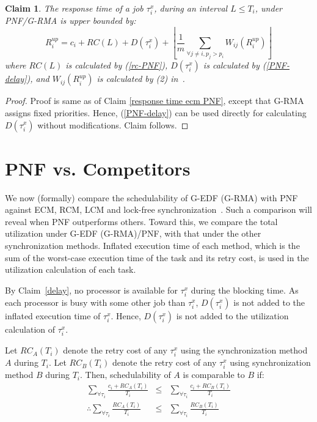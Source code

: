 \documentclass[a4paper,english]{article}
\newtheorem{clm}{Claim}
\newtheorem{proof}{Proof}
\begin{document}
\begin{clm}\label{response rcm PNF}
The response time of a job $\tau_{i}^{x}$, during an interval $L\le T_{i}$, under PNF/G-RMA is upper bounded by: 
\begin{equation}
R_{i}^{up}=c_{i}+RC(L)+D(\tau_{i}^{x})+\left\lfloor \frac{1}{m}\sum_{\forall j\ne i,p_j>p_i}W_{ij}(R_{i}^{up})\right\rfloor 
\end{equation}
where $RC(L)$ is calculated by (\ref{rc-PNF}), $D(\tau_{i}^{x})$
is calculated by (\ref{PNF-delay}), and $W_{ij}(R_{i}^{up})$
is calculated by (2) in~\cite{stmconcurrencycontrol:emsoft11}.
\end{clm}
\begin{proof}\normalfont
Proof is same as of Claim \ref{response time ecm PNF}, 
except that G-RMA assigns fixed priorities. Hence, (\ref{PNF-delay}) can be used directly for calculating $D(\tau_{i}^{x})$ without modifications. Claim follows.
\end{proof}


\section{PNF vs. Competitors}
\label{sec:pnf-sched-comparison}

We now (formally) compare the schedulability of G-EDF (G-RMA) with PNF against ECM, RCM, LCM and lock-free synchronization~\cite{stmconcurrencycontrol:emsoft11,lcmdac2012, key-5}. 
Such a comparison will reveal when PNF outperforms  others. 
Toward this, we compare the total utilization under G-EDF (G-RMA)/PNF,  with that under the other synchronization methods.
Inflated execution time of each method, which is the sum of the worst-case execution time of the task and its retry cost, is used in the utilization calculation of each task.

By Claim~\ref{delay}, no processor is available for $\tau_i^x$ during the blocking time. As each processor is busy with some other job than $\tau_i^x$, $D(\tau_i^x)$ is not added to the inflated execution time of $\tau_i^x$. Hence, $D(\tau_i^x)$ is not added to the utilization calculation of $\tau_i^x$.

Let $RC_{A}(T_{i})$ denote the retry cost of any $\tau_i^x$ using the synchronization method $A$ during $T_i$. Let $RC_{B}(T_{i})$ denote the  retry cost of any $\tau_i^x$ using synchronization method $B$ during $T_i$. Then, schedulability of $A$ is comparable to $B$ if:
\begin{eqnarray}
\sum_{\forall\tau_{i}}\frac{c_{i}+RC_{A}(T_{i})}{T_{i}} & \le & \sum_{\forall\tau_{i}}\frac{c_{i}+RC_{B}(T_{i})}{T_{i}}\nonumber \\
\therefore\sum_{\forall\tau_{i}}\frac{RC_{A}(T_{i})}{T_{i}} & \le & \sum_{\forall\tau_{i}}\frac{RC_{B}(T_{i})}{T_{i}}\label{utilization comparison}
\end{eqnarray}
\end{document}
